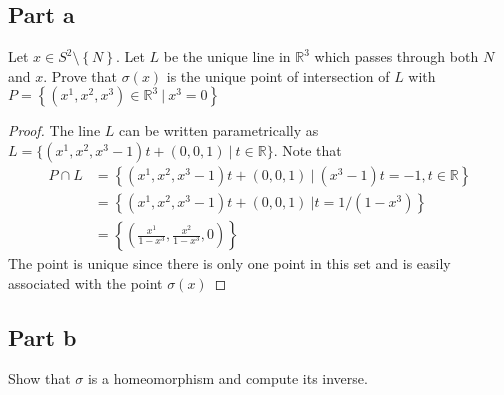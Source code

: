 \documentclass[a4paper]{article}
\begin{document}
\subsection*{Part a}%
\label{sub:Part a}
Let $x \in S^2 \setminus \left\{ N \right\}$. Let $L$ be the unique line in $\mathds{R}^3$ which passes through both $N$ and $x$. Prove that $\sigma(x)$ is the unique point of intersection of $L$ with $P = \left\{ (x^1, x^2, x^3) \in \mathds{R}^3\ |\ x^3 = 0 \right\}$

\begin{proof}
  The line $L$ can be written parametrically as $L = \{(x^1, x^2, x^3 - 1)t + (0,0,1)\ |\ t \in \mathds{R}\}$. 
  Note that 
  \[
    \begin{aligned}
      P \cap L &= \left\{ (x^1, x^2, x^3 - 1)t + (0,0,1)\ |\ (x^3 - 1)t = -1, t \in \mathds{R} \right\}\\
               &= \left\{ (x^1, x^2, x^3 - 1)t + (0,0,1)\ | t = 1/(1 - x^3) \right\} \\
               &= \left\{ \left(\frac{x^1}{1 - x^3}, \frac{x^2}{1-x^3}, 0\right) \right\}
    \end{aligned}
  \]
  The point is unique since there is only one point in this set and is easily associated with the point $\sigma(x)$
\end{proof}

\subsection*{Part b}%
\label{sub:Part b}
Show that $\sigma$ is a homeomorphism and compute its inverse.
\end{document}
